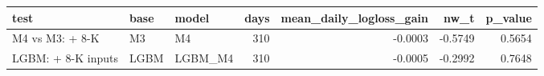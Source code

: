 \begin{tabular}{lllrrrr}
\toprule
test & base & model & days & mean\_daily\_logloss\_gain & nw\_t & p\_value \\
\midrule
M4 vs M3: + 8-K & M3 & M4 & 310 & -0.0003 & -0.5749 & 0.5654 \\
LGBM: + 8-K inputs & LGBM & LGBM\_M4 & 310 & -0.0005 & -0.2992 & 0.7648 \\
\bottomrule
\end{tabular}
